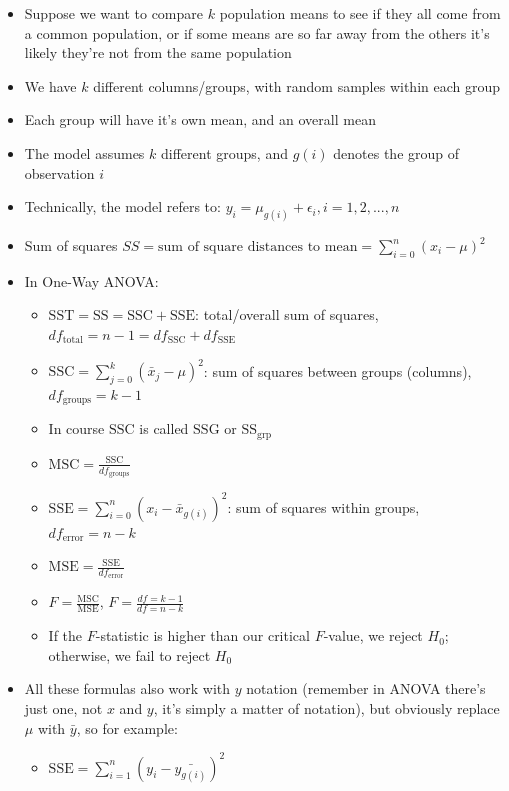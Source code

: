 \documentclass{article}
\begin{document}
\begin{itemize}
    \item Suppose we want to compare $k$ population means to see if they all come from a common population, or if some means are so far away from the others it's likely they're not from the same population
    \item We have $k$ different columns/groups, with random samples within each group
    \item Each group will have it's own mean, and an overall mean
    \item The model assumes $k$ different groups, and $g(i)$ denotes the group of observation $i$
    \item Technically, the model refers to: $y_i=\mu_{g(i)}+\epsilon_i, i=1,2,...,n$
    \item Sum of squares $SS=\text{sum of square distances to mean}=\sum_{i=0}^{n}(x_i-\mu)^2$
    \item In One-Way ANOVA:
    \begin{itemize}
        \item $\text{SST}=\text{SS}=\text{SSC}+\text{SSE}$: total/overall sum of squares, $df_{\text{total}}=n-1=df_{\text{SSC}}+df_{\text{SSE}}$
        \item $\text{SSC}=\sum_{j=0}^{k}(\bar{x}_j-\mu)^2$: sum of squares between groups (columns), $df_{\text{groups}}=k-1$
        \item In course $\text{SSC}$ is called $\text{SSG}$ or $\text{SS}_{\text{grp}}$
        \item $\text{MSC}=\frac{\text{SSC}}{df_{\text{groups}}}$
        \item $\text{SSE}=\sum_{i=0}^{n}(x_i-\bar{x}_{g(i)})^2$: sum of squares within groups, $df_{\text{error}}=n-k$
        \item $\text{MSE}=\frac{\text{SSE}}{df_{\text{error}}}$
        \item $F=\frac{\text{MSC}}{\text{MSE}}$, $F=\frac{df=k-1}{df=n-k}$
        \item If the $F$-statistic is higher than our critical $F$-value, we reject $H_0$; otherwise, we fail to reject $H_0$
    \end{itemize}
    \item All these formulas also work with $y$ notation (remember in ANOVA there's just one, not $x$ and $y$, it's simply a matter of notation), but obviously replace $\mu$ with $\bar{y}$, so for example:
    \begin{itemize}
        \item $\text{SSE}=\sum_{i=1}^{n} (y_i-\bar{y_{g(i)}})^2$

\end{itemize}
\end{itemize}
\end{document}
